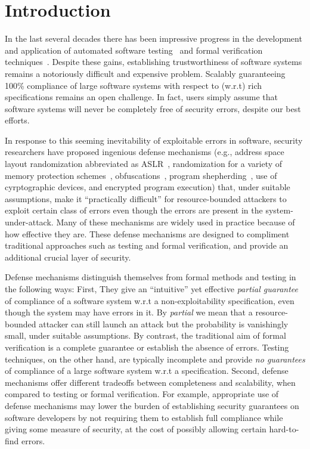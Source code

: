 \section{Introduction}


In the last several decades there has been impressive progress in the
development and application of automated software
testing~\cite{king1976sea, dart, CadarGPDE2006, SenMA2005} and formal
verification techniques~\cite{floyd, floyd71,
  DBLP:journals/cacm/Hoare69, clarke}. Despite these gains,
establishing trustworthiness of software systems remains a notoriously
difficult and expensive problem. Scalably guaranteeing 100\%
compliance of large software systems with respect to (w.r.t) rich
specifications remains an open challenge. In fact, users simply assume
that software systems will never be completely free of security
errors, despite our best efforts.

In response to this seeming inevitability of exploitable errors in
software, security researchers have proposed ingenious defense
mechanisms (e.g., address space layout randomization abbreviated as
ASLR~\cite{aslr}, randomization for a variety of memory protection
schemes~\cite{diehard}, obfuscations~\cite{variaphd}, program
shepherding~\cite{kiriansky}, use of cyrptographic devices, and
encrypted program execution) that, under suitable assumptions, make it
``practically difficult'' for resource-bounded attackers to exploit
certain class of errors even though the errors are present in the
system-under-attack. Many of these mechanisms are widely used in
practice because of how effective they are. These defense mechanisms
are designed to compliment traditional approaches such as testing and
formal verification, and provide an additional crucial layer of
security. 

Defense mechanisms distinguish themselves from formal methods and
testing in the following ways: First, They give an ``intuitive'' yet
effective {\it partial guarantee} of compliance of a software system
w.r.t a non-exploitability specification, even though the system may
have errors in it. By {\it partial} we mean that a resource-bounded
attacker can still launch an attack but the probability is vanishingly
small, under suitable assumptions. By contrast, the traditional aim of
formal verification is a complete guarantee or establish the absence
of errors. Testing techniques, on the other hand, are typically
incomplete and provide {\it no guarantees} of compliance of a large
software system w.r.t a specification. Second, defense mechanisms
offer different tradeoffs between completeness and scalability, when
compared to testing or formal verification. For example, appropriate
use of defense mechanisms may lower the burden of establishing
security guarantees on software developers by not requiring them to
establish full compliance while giving some measure of security, at
the cost of possibly allowing certain hard-to-find errors.

